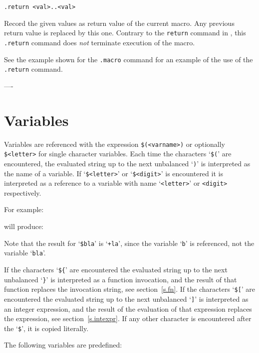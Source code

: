 \begin{verbatim}
.return <val>..<val>
\end{verbatim}
\begin{desc}
Record the given values as return value of the current macro.
Any previous return value is replaced by this one.
Contrary to the {\tt return} command in {\C}, this \verb+.return+
command does {\em not} \/terminate execution of the macro.
\par
See the example shown for the \verb'.macro' command for an example of the
use of the \verb'.return' command.
\end{desc}
----
\section{Variables}
Variables are referenced with the expression
{\tt \$(<varname>)} or optionally {\tt \$<letter>} for single character
variables.
Each time the characters `{\tt \$(}' are encountered,
the evaluated string up to the next unbalanced `{\tt )}' 
is interpreted as the name of a variable.
If `{\tt \$<letter>}' or `{\tt \$<digit>}' is encountered it is interpreted as
a reference to a variable with name `{\tt <letter>}' or {\tt <digit>}
respectively.
\par
For example:

will produce:

Note that the result for `\verb+$bla+' is `{\tt +la}', since the
variable `{\tt b}' is referenced, not the variable `{\tt bla}'.
\par
If the characters `{\tt \$\{}' are encountered the evaluated string up to
the next unbalanced `{\tt \}}' is interpreted as a function invocation,
and the result of that function replaces the invocation string,
see section~\ref{s.fn}.
If the characters `{\tt \$[}' are encountered the evaluated string up
to the next unbalanced `{\tt ]}' is interpreted as an integer expression,
and the result of the evaluation of that expression replaces the expression,
see section~\ref{s.intexpr}.
If any other character is encountered after the `{\tt \$}',
it is copied literally.
\par
The following variables are predefined:
\par
